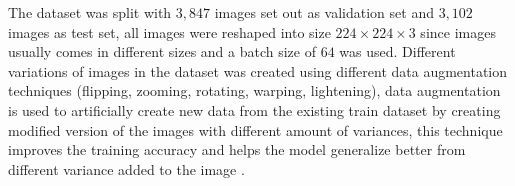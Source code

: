 \documentclass[12pt]{report}
\numberwithin{equation}{section}
\begin{document}
The dataset was split with $3,847$ images set out as validation set and $3,102$ images as test set, all images were reshaped into size $224\times 224\times 3$ since images usually comes in different sizes and a batch size of $64$ was used. Different variations of images in the dataset was created using different data augmentation techniques (flipping, zooming, rotating, warping, lightening), data augmentation is used to artificially create new data from the existing train dataset by creating modified version of the images with different amount of variances, this technique improves the training accuracy and helps the model generalize better from different variance added to the image \textbf{\cite{stephen2019efficient}}. 

\end{document}
